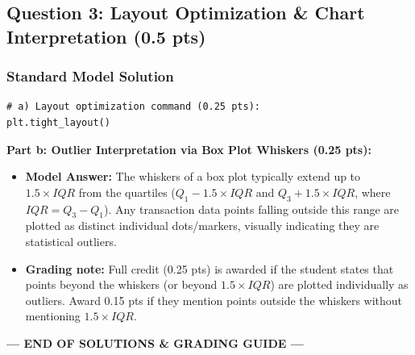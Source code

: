 \documentclass[11pt,a4paper]{article}
\newcommand{\rubricbox}[1]{
  \begin{tcolorbox}[
    colback=rubricgreen,
    colframe=rubricborder,
    boxrule=0.6pt,
    arc=2pt,
    left=3mm, right=3mm, top=2mm, bottom=2mm
  ]
  \small #1
  \end{tcolorbox}
}
\begin{document}
\subsection*{Question 3: Layout Optimization \& Chart Interpretation (0.5 pts)}

\subsubsection*{Standard Model Solution}
\begin{lstlisting}
# a) Layout optimization command (0.25 pts):
plt.tight_layout()
\end{lstlisting}

\rubricbox{
  \textbf{Part b: Outlier Interpretation via Box Plot Whiskers (0.25 pts):}
  \begin{itemize}[itemsep=2pt]
    \item \textbf{Model Answer:} The whiskers of a box plot typically extend up to $1.5 \times IQR$ from the quartiles ($Q_1 - 1.5 \times IQR$ and $Q_3 + 1.5 \times IQR$, where $IQR = Q_3 - Q_1$). Any transaction data points falling outside this range are plotted as distinct individual dots/markers, visually indicating they are statistical outliers.
    \item \textbf{Grading note:} Full credit (0.25 pts) is awarded if the student states that points beyond the whiskers (or beyond $1.5 \times IQR$) are plotted individually as outliers. Award 0.15 pts if they mention points outside the whiskers without mentioning $1.5 \times IQR$.
  \end{itemize}
}

\vfill
\begin{center}
\small \textbf{--- END OF SOLUTIONS \& GRADING GUIDE ---}
\end{center}
\end{document}
